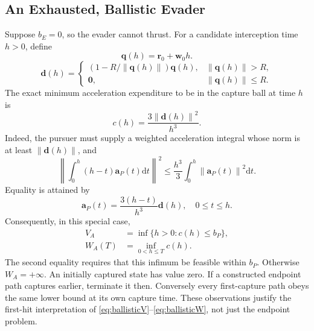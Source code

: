 \documentclass[journal,a4paper]{IEEEtran}
\newcommand{\norm}[1]{\left\|#1\right\|}
\newcommand{\dd}{\mathrm d}
\begin{document}
\subsection{An Exhausted, Ballistic Evader}
Suppose $b_E=0$, so the evader cannot thrust. For a candidate interception time $h>0$, define
\begin{equation}
 \mathbf q(h)=\mathbf r_0+\mathbf w_0h.
\end{equation}
\begin{equation}
 \mathbf d(h)=
 \begin{cases}
 (1-R/\norm{\mathbf q(h)})\mathbf q(h),&\norm{\mathbf q(h)}>R,\\
 \mathbf0,&\norm{\mathbf q(h)}\le R.
 \end{cases}
\end{equation}
The exact minimum acceleration expenditure to be in the capture ball at time $h$ is
\begin{equation}
 \boxed{c(h)=\frac{3\norm{\mathbf d(h)}^2}{h^3}.}
 \label{eq:ballisticcost}
\end{equation}
Indeed, the pursuer must supply a weighted acceleration integral whose norm is at least $\norm{\mathbf d(h)}$, and
\begin{equation}
 \norm{\int_0^h(h-t)\mathbf a_P(t)\dd t}^2
 \le\frac{h^3}{3}\int_0^h\norm{\mathbf a_P(t)}^2\dd t.
\end{equation}
Equality is attained by
\begin{equation}
 \boxed{\mathbf a_P(t)=\frac{3(h-t)}{h^3}\mathbf d(h),
                     \quad 0\le t\le h.}
 \label{eq:ballisticcontrol}
\end{equation}
Consequently, in this special case,
\begin{align}
 V_A&=\inf\{h>0:c(h)\le b_P\},\label{eq:ballisticV}\\
 W_A(T)&=\inf_{0<h\le T}c(h).\label{eq:ballisticW}
\end{align}
The second equality requires that this infimum be feasible within $b_P$.
Otherwise $W_A=+\infty$. An initially captured state has value zero. If a constructed endpoint path captures earlier, terminate it then. Conversely every first-capture path obeys the same lower bound at its own capture time. These observations justify the first-hit interpretation of \eqref{eq:ballisticV}--\eqref{eq:ballisticW}, not just the endpoint problem.
\end{document}
